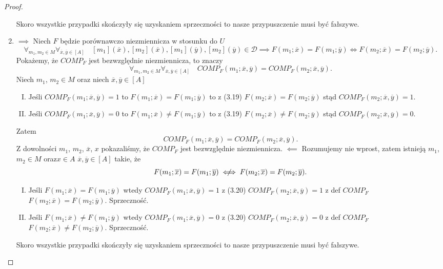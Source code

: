 \documentclass[12pt,a4paper]{report}
\newcommand{\domkniecie}[1]{\left\lbrack{#1}\right\rbrack}
\newcommand{\notiff}{%
  \mathrel{{\ooalign{\hidewidth$\not\phantom{"}$\hidewidth\cr$\iff$}}}}
\begin{document}
\begin{proof}
\begin{enumerate}
\begin{enumerate}[I.]
\end{enumerate}
Skoro wszystkie przypadki skończyły się uzyskaniem sprzeczności to nasze przypuszczenie musi być fałszywe.
\item 
$\implies$
Niech $F$ będzie porównawczo niezmiennicza w stosunku do $U$ 
\begin{equation}
\forall_{m_1, m_2 \in M}  \forall_{\overline{x},\overline{y} \in \domkniecie{A}} \quad  \domkniecie{m_1}(\overline{x}), \domkniecie{ m_2}(\overline{x}), \domkniecie{m_1}(\overline{y}), \domkniecie{m_2}(\overline{y}) \in \mathcal{D} \implies  F(m_{1};\overline{x})=F(m_{1};\overline{y}) \iff F(m_{2};\overline{x})=F(m_{2};\overline{y}).
\end{equation}
Pokażemy, że $COMP_{F}$ jest bezwzględnie niezmiennicza, to znaczy
\begin{equation}
\forall_{m_1, m_2 \in M} \forall_{\overline{x}, \overline{y}\in \domkniecie{A}} \quad COMP_{F}(m_1;\overline{x},\overline{y})=COMP_{F}(m_2;\overline{x},\overline{y}).
\end{equation}
 Niech $m_1$, $m_2 \in M$ oraz niech $\overline{x}, \overline{y} \in \domkniecie{A}$ 
\begin{enumerate}[I.]
\item
Jeśli $COMP_{F}(m_1;\overline{x},\overline{y})=1$ to $F(m_1;\overline{x})=F(m_1;\overline{y})$ to z (3.19) $F(m_2;\overline{x})=F(m_2;\overline{y})$ stąd $COMP_{F}(m_2;\overline{x},\overline{y})=1$.
\item
Jeśli $COMP_{F}(m_1;\overline{x},\overline{y})=0$ to $F(m_1;\overline{x})\ne F(m_1;\overline{y})$ to z (3.19) $F(m_2;\overline{x})\ne F(m_2;\overline{y})$ stąd $COMP_{F}(m_2;\overline{x},\overline{y})=0$.
\end{enumerate}
Zatem 
$$
COMP_{F}(m_1;\overline{x},\overline{y})=COMP_{F}(m_2;\overline{x},\overline{y}).
$$
Z dowolności $m_1$, $m_2$, $\overline{x}$, $x$ pokazaliśmy, że $COMP_{F}$ jest bezwzględnie niezmiennicza.
$\impliedby$
Rozumujemy nie wprost, zatem istnieją $m_1$, $m_2 \in M$ oraz$x\in A$ $\overline{x}, \overline{y} \in \domkniecie{A}$ takie, że
$$
F(m_{1};\overline{x})=F(m_{1};\overline{y}) \notiff F(m_{2};\overline{x})=F(m_{2};\overline{y}).
$$
\begin{enumerate}[I.]
\item
Jeśli $F(m_1;\overline{x})=F(m_1;\overline{y})$ wtedy $COMP_{F}(m_1;\overline{x},\overline{y})=1$ z (3.20) $COMP_{F}(m_2;\overline{x},\overline{y})=1$ z def $COMP_F$ $F(m_2;\overline{x})=F(m_2;\overline{y})$. Sprzeczność.
\item
Jeśli $F(m_1;\overline{x})\ne F(m_1;\overline{y})$ wtedy $COMP_{F}(m_1;\overline{x},\overline{y})=0$ z (3.20) $COMP_{F}(m_2;\overline{x},\overline{y})=0$ z def $COMP_F$ $F(m_2;\overline{x})\ne F(m_2;\overline{y})$. Sprzeczność.
\end{enumerate}
Skoro wszystkie przypadki skończyły się uzyskaniem sprzeczności to nasze przypuszczenie musi być fałszywe.
\end{enumerate}
\end{proof}
\end{document}
